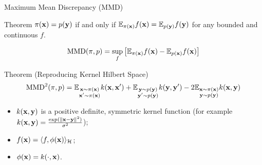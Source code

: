 \documentclass{beamer}
\begin{document}
\begin{frame}{Maximum Mean Discrepancy (MMD)}
	\begin{block}{Theorem}
		$\pi(\mathbf{x}) = p(\mathbf{y})$ if and only if $\mathbb{E}_{\pi(\mathbf{x})} f(\mathbf{x}) = \mathbb{E}_{p(\mathbf{y})} f(\mathbf{y})$ for any bounded and continuous $f$.
	\end{block}
	\vspace{-0.3cm}
	\[
		\text{MMD}(\pi, p) = \sup_f \left[ \mathbb{E}_{\pi(\mathbf{x})} f(\mathbf{x}) - \mathbb{E}_{p(\mathbf{x})} f(\mathbf{x}) \right]
	\]	
	\vspace{-0.3cm}
	\begin{block}{Theorem (Reproducing Kernel Hilbert Space)}
		\vspace{-0.6cm}
		\[
			\text{MMD}^2(\pi, p) = \mathbb{E}_{\substack{\mathbf{x} \sim\pi(\mathbf{x}) \\ \mathbf{x}' \sim\pi(\mathbf{x})}} k(\mathbf{x}, \mathbf{x}') + \mathbb{E}_{\substack{\mathbf{y} \sim p(\mathbf{y}) \\ \mathbf{y}' \sim p(\mathbf{y})}} k(\mathbf{y}, \mathbf{y}') - 2 \mathbb{E}_{\substack{\mathbf{x} \sim\pi(\mathbf{x}) \\ \mathbf{y} \sim p(\mathbf{y})}} k(\mathbf{x}, \mathbf{y})
		\]
		\begin{itemize}
			\item $k(\mathbf{x}, \mathbf{y})$ is a positive definite, symmetric kernel function (for example $k(\mathbf{x}, \mathbf{y}) = \frac{\exp(\|\mathbf{x} - \mathbf{y}\|^2)}{\sigma^2}$);
			\item $f(\mathbf{x}) = \langle f, \phi(\mathbf{x}) \rangle_{\mathcal{H}}$;
			\item $\phi(\mathbf{x}) = k(\cdot, \mathbf{x})$.
		\end{itemize} 
		\vspace{-0.3cm}
	\end{block}
\end{frame}
\end{document}
